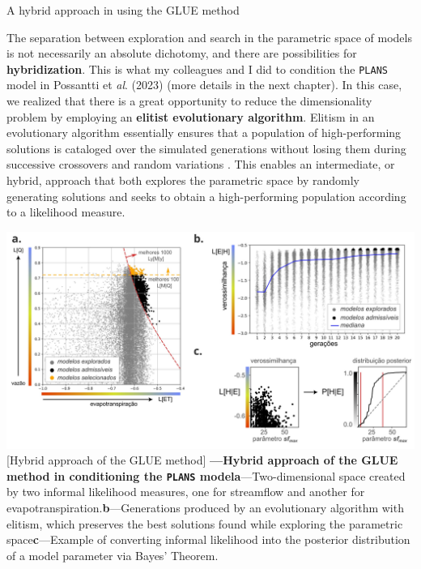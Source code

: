 \documentclass[./main_en.tex]{subfiles}
\begin{document}
\begin{simplebox}[
    float=ht!,
    label={highlight_hybrid_approach},
    nameref={Hybrid exploration}
    ]{A hybrid approach in using the GLUE method}
    \footnotesize
    \begin{minipage}[t]{\linewidth}  
    \par The separation between exploration and search in the parametric space of models is not necessarily an absolute dichotomy, and there are possibilities for \textbf{hybridization}. This is what my colleagues and I did to condition the \texttt{PLANS} model in Possantti et \textit{al}. (2023) \cite{Possantti2023a} (more details in the next chapter). In this case, we realized that there is a great opportunity to reduce the dimensionality problem by employing an \textbf{elitist evolutionary algorithm}. Elitism in an evolutionary algorithm essentially ensures that a population of high-performing solutions is cataloged over the simulated generations without losing them during successive crossovers and random variations \cite{eiben2015introduction}. This enables an intermediate, or hybrid, approach that both explores the parametric space by randomly generating solutions and seeks to obtain a high-performing population according to a likelihood measure.     
    \end{minipage}
    
    \begin{minipage}[t]{\linewidth}
        \begin{minipage}[t]{\linewidth}
        \vspace*{5pt}
        	\includegraphics[width=\linewidth]{figs/fig_glue.jpg}	
        	[Hybrid approach of the GLUE method]{
                \textbf{---\;Hybrid approach of the GLUE method in conditioning the \texttt{PLANS} model}\;\textbf{a}\;---\;Two-dimensional space created by two informal likelihood measures, one for streamflow and another for evapotranspiration.\;\textbf{b}\;---\;Generations produced by an evolutionary algorithm with elitism, which preserves the best solutions found while exploring the parametric space\;\textbf{c}\;---\;Example of converting informal likelihood into the posterior distribution of a model parameter via Bayes' Theorem. 
        	}
            \label{fig:glue}  %
        \vspace*{5pt}
        \end{minipage}
    \end{minipage}
    

\end{simplebox}
\end{document}
